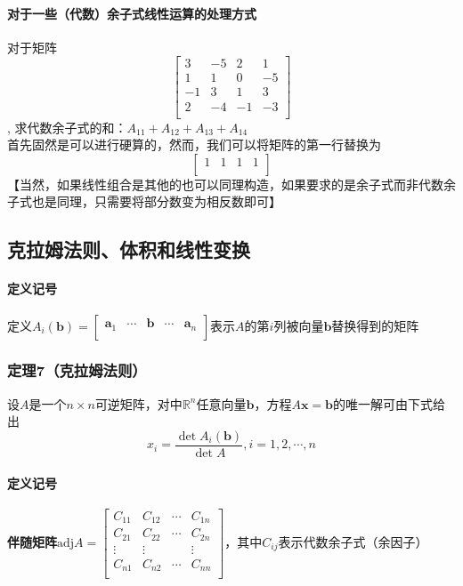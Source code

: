 \documentclass{article}
\newcommand{\ve}{\boldsymbol}
\begin{document}
\begin{CJK}{UTF8}{gkai}
\paragraph{对于一些（代数）余子式线性运算的处理方式\\}
对于矩阵
\[\begin{bmatrix}
    3&-5&2&1\\
    1&1&0&-5\\
    -1&3&1&3\\
    2&-4&-1&-3\\
\end{bmatrix}\],
求代数余子式的和：$A_{11}+A_{12}+A_{13}+A_{14}$\\
首先固然是可以进行硬算的，然而，我们可以将矩阵的第一行替换为
\[\begin{bmatrix}
    1&1&1&1\\
\end{bmatrix}\]
【当然，如果线性组合是其他的也可以同理构造，如果要求的是余子式而非代数余子式也是同理，只需要将部分数变为相反数即可】\\
\subsection{克拉姆法则、体积和线性变换}
\paragraph{定义记号\\}
定义$A_i(\ve{b})=\begin{bmatrix}\ve{a}_1&\cdots&\ve{b}&\cdots&\ve{a}_n\\\end{bmatrix}$表示$A$的第$i$列被向量$\ve{b}$替换得到的矩阵\\
\subsubsection{定理7（克拉姆法则）}
设$A$是一个$n\times n$可逆矩阵，对中$\mathbb{R}^n$任意向量$\ve{b}$，方程$A\ve{x}=\ve{b}$的唯一解可由下式给出
\[x_i=\dfrac{\det A_i(\ve{b})}{\det A},i=1,2,\cdots,n\]
\paragraph{定义记号\\}
\textbf{伴随矩阵}$\text{adj} A=\begin{bmatrix}
C_{11}&C_{12}&\cdots&C_{1n}\\
C_{21}&C_{22}&\cdots&C_{2n}\\
\vdots&\vdots& &\vdots\\
C_{n1}&C_{n2}&\cdots&C_{nn}\\
\end{bmatrix}$，其中$C_{ij}$表示代数余子式（余因子）\\ 

\end{CJK}
\end{document}
